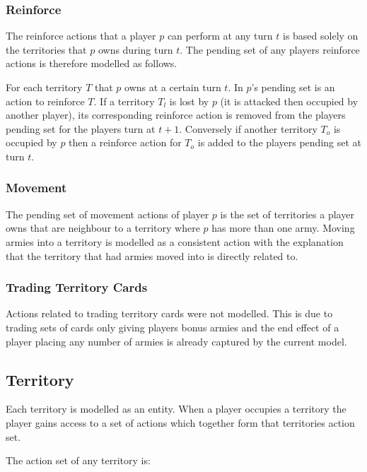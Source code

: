 \documentclass[parskip]{cs4rep}
\begin{document}
\newpage

\subsubsection{Reinforce}

The reinforce actions that a player $p$ can perform at any turn $t$ is based solely on the territories that $p$ owns during turn $t$. The pending set of any players reinforce actions is therefore modelled as follows. 

For each territory $T$ that $p$ owns at a certain turn $t$. In $p$'s pending set is an action to reinforce $T$. If a territory $T_{l}$ is lost by $p$ (it is attacked then occupied by another player), its corresponding reinforce action is removed from the players pending set for the players turn at $t+1$. Conversely if another territory $T_{o}$ is occupied by $p$ then a reinforce action for $T_{o}$ is added to the players pending set at turn $t$.

\subsubsection{Movement}

The pending set of movement actions of player $p$ is the set of territories a player owns that are neighbour to a territory where $p$ has more than one army. Moving armies into a territory is modelled as a consistent action with the explanation that the territory that had armies moved into is directly related to.

\subsubsection{Trading Territory Cards}

Actions related to trading territory cards were not modelled. This is due to trading sets of cards only giving players bonus armies and the end effect of a player placing any number of armies is already captured by the current model.

\subsection{Territory}

Each territory is modelled as an entity. When a player occupies a territory the player gains access to a set of actions which together form that territories action set.

The action set of any territory is:
\end{document}
